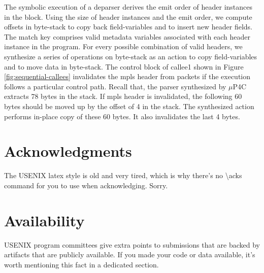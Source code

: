 The symbolic execution of a deparser derives the emit order of header instances in the block.
Using the size of header instances and the emit order, we compute offsets in byte-stack to copy back field-variables and to insert new header fields.
The match key comprises valid metadata variables associated with each header instance in the program.
For every possible combination of valid headers, we synthesize a series of operations on byte-stack as an action to copy field-variables and to move data in byte-stack.
The control block of callee1 shown in Figure \ref{fig:sequential-callees} invalidates the mpls header from packets if the execution follows a particular control path.
Recall that, the parser synthesized by $\mu$P4C extracts 78 bytes in the stack.
If mpls header is invalidated, the following 60 bytes should be moved up by the offset of 4 in the stack.
The synthesized action performs in-place copy of these 60 bytes. It also invalidates the last 4 bytes.








\section*{Acknowledgments}

The USENIX latex style is old and very tired, which is why
there's no \textbackslash{}acks command for you to use when
acknowledging. Sorry.

\section*{Availability}

USENIX program committees give extra points to submissions that are
backed by artifacts that are publicly available. If you made your code
or data available, it's worth mentioning this fact in a dedicated
section.






